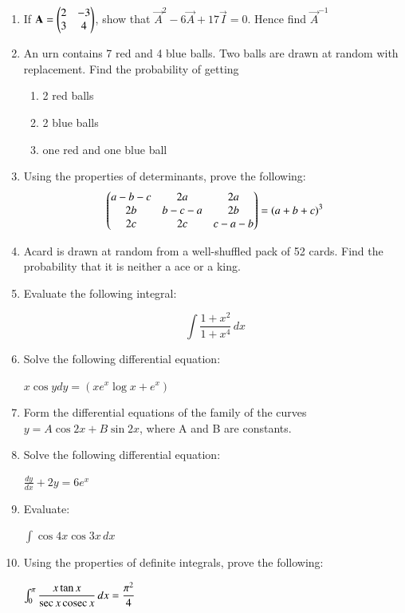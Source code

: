 \documentclass[journal,12pt,twocolumn]{IEEEtran}
\begin{document}
\begin{enumerate}
\item If $\mathbf{A} =\begin{pmatrix}2&-3\\3&4\end{pmatrix}$, show that $\vec{A}^2 - 6\vec{A} + 17\vec{I} = 0$. Hence find $\vec{A}^{-1}$
\medskip
\item An urn contains 7 red and 4 blue balls. Two balls are drawn at random with replacement. Find the probability of getting
\begin{enumerate}
\item 2 red balls
\item 2 blue balls
\item one red and one blue ball
\end{enumerate} 
\medskip
\item Using the properties of determinants, prove the following:
\begin{align}
	\begin{pmatrix}
a-b-c & 2a& 2a\\ 2b& b-c-a& 2b\\2c&2c&c-a-b
	\end{pmatrix}
= (a+b+c)^3
\end{align}
\medskip
\item Acard is drawn at random from a well-shuffled pack of 52 cards. Find the probability that it is neither a ace or a king.
\medskip
\item Evaluate the following integral:
\begin{center}
\[\int \displaystyle\frac{1+x^2}{1+x^4}\,dx\]
\end{center}
\medskip
\item Solve the following differential equation:
\begin{center}
$x \cos y dy=(xe^x\log x + e^x)$
\end{center}
\medskip
\item Form the differential equations of the family of the curves $y = A\cos 2x + B\sin 2x$, where A and B are constants.
 \medskip
\item Solve the following differential equation:
\begin{center}
   $ \displaystyle\frac{dy}{dx} + 2y = 6e^x$
\end{center}
\medskip
\item Evaluate:
\begin{center}
  $ \int \cos 4x\cos 3x\, dx $
\end{center}
\medskip
\item Using the properties of definite integrals, prove the following:
\begin{center}
 $ \int_{0}^{\pi} \displaystyle\frac{x\tan x}{\sec x\,\text{cosec}\, x}\, dx = \displaystyle\frac{\pi^2}{4} $

\end{center}
\end{enumerate}
\end{document}
